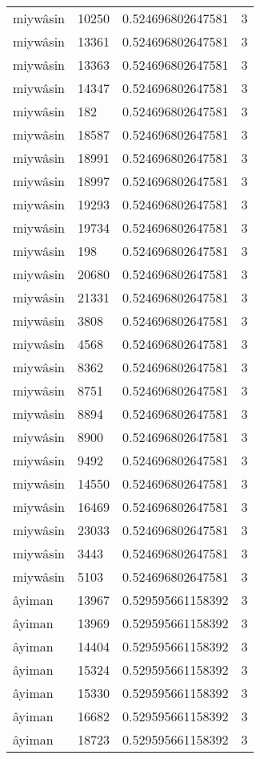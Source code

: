 \begin{longtable}{llll}
miywâsin & 10250 & 0.524696802647581 & 3 \\
miywâsin & 13361 & 0.524696802647581 & 3 \\
miywâsin & 13363 & 0.524696802647581 & 3 \\
miywâsin & 14347 & 0.524696802647581 & 3 \\
miywâsin & 182 & 0.524696802647581 & 3 \\
miywâsin & 18587 & 0.524696802647581 & 3 \\
miywâsin & 18991 & 0.524696802647581 & 3 \\
miywâsin & 18997 & 0.524696802647581 & 3 \\
miywâsin & 19293 & 0.524696802647581 & 3 \\
miywâsin & 19734 & 0.524696802647581 & 3 \\
miywâsin & 198 & 0.524696802647581 & 3 \\
miywâsin & 20680 & 0.524696802647581 & 3 \\
miywâsin & 21331 & 0.524696802647581 & 3 \\
miywâsin & 3808 & 0.524696802647581 & 3 \\
miywâsin & 4568 & 0.524696802647581 & 3 \\
miywâsin & 8362 & 0.524696802647581 & 3 \\
miywâsin & 8751 & 0.524696802647581 & 3 \\
miywâsin & 8894 & 0.524696802647581 & 3 \\
miywâsin & 8900 & 0.524696802647581 & 3 \\
miywâsin & 9492 & 0.524696802647581 & 3 \\
miywâsin & 14550 & 0.524696802647581 & 3 \\
miywâsin & 16469 & 0.524696802647581 & 3 \\
miywâsin & 23033 & 0.524696802647581 & 3 \\
miywâsin & 3443 & 0.524696802647581 & 3 \\
miywâsin & 5103 & 0.524696802647581 & 3 \\
âyiman & 13967 & 0.529595661158392 & 3 \\
âyiman & 13969 & 0.529595661158392 & 3 \\
âyiman & 14404 & 0.529595661158392 & 3 \\
âyiman & 15324 & 0.529595661158392 & 3 \\
âyiman & 15330 & 0.529595661158392 & 3 \\
âyiman & 16682 & 0.529595661158392 & 3 \\
âyiman & 18723 & 0.529595661158392 & 3 \\

\end{longtable}
